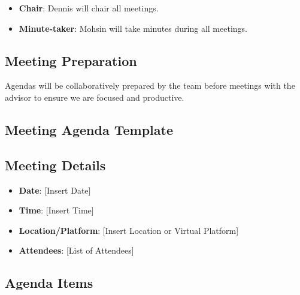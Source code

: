 \documentclass{article}
\begin{document}
\begin{itemize}
    \item \textbf{Chair}: Dennis will chair all meetings.
    \item \textbf{Minute-taker}: Mohsin will take minutes during all meetings.
\end{itemize}

\subsection*{Meeting Preparation}

Agendas will be collaboratively prepared by the team before meetings with the advisor to 
ensure we are focused and productive.

\subsection{Meeting Agenda Template}

\subsection*{Meeting Details}

\begin{itemize}
    \item \textbf{Date}: [Insert Date]
    \item \textbf{Time}: [Insert Time]
    \item \textbf{Location/Platform}: [Insert Location or Virtual Platform]
    \item \textbf{Attendees}: [List of Attendees]
\end{itemize}

\subsection*{Agenda Items}
\end{document}

